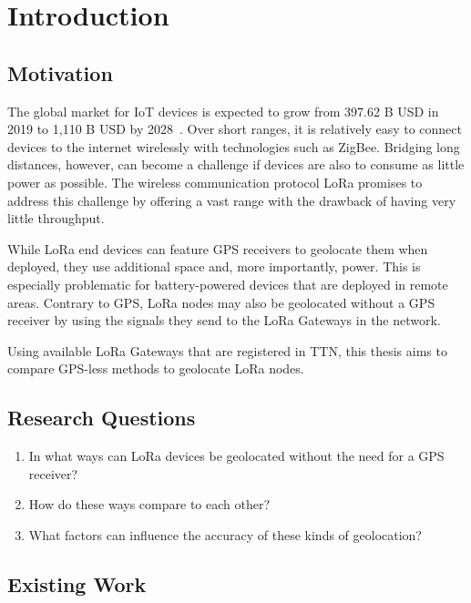 \chapter{Introduction}

\section{Motivation}

The global market for IoT devices is expected to grow from 397.62 B USD in 2019 to 1,110 B USD by 2028~\cite{grand_view_research_global_2022}.
Over short ranges, it is relatively easy to connect devices to the internet wirelessly with technologies such as ZigBee.
Bridging long distances, however, can become a challenge if devices are also to consume as little power as possible.
The wireless communication protocol \ac{LoRa} promises to address this challenge by offering a vast range with the drawback of having very little throughput.

While \ac{LoRa} end devices can feature \ac{GPS} receivers to geolocate them when deployed, they use additional space and, more importantly, power.
This is especially problematic for battery-powered devices that are deployed in remote areas.
Contrary to \ac{GPS}, \ac{LoRa} nodes may also be geolocated without a GPS receiver by using the signals they send to the \ac{LoRa} Gateways in the network.

Using available \ac{LoRa} Gateways that are registered in \acf{TTN}, this thesis aims to compare \ac{GPS}-less methods to geolocate \ac{LoRa} nodes.

\section{Research Questions}

\begin{enumerate}
    \item In what ways can \ac{LoRa} devices be geolocated without the need for a GPS receiver?
    \item How do these ways compare to each other?
    \item What factors can influence the accuracy of these kinds of geolocation?
\end{enumerate}

\section{Existing Work}

